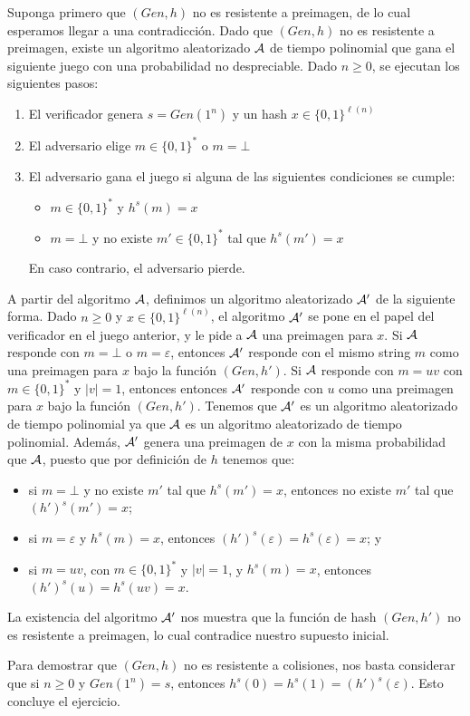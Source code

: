 \documentclass[11pt]{article}
\newcommand{\Gen}{\textit{Gen}}
\begin{document}
Suponga primero que $(\Gen, h)$ no es resistente a preimagen, de lo
cual esperamos llegar a una contradicción.  Dado que $(\Gen, h)$ no es
resistente a preimagen, existe un algoritmo aleatorizado ${\cal A}$ de
tiempo polinomial que gana el siguiente juego con una probabilidad no
despreciable. Dado $n \geq 0$, se ejecutan los siguientes pasos:
\begin{enumerate}
\item El verificador genera $s = \Gen(1^n)$ y un hash
  $x \in \{0,1\}^{\ell(n)}$
\item El adversario elige $m \in \{0,1\}^*$ o $m = \bot$
\item El adversario gana el juego si alguna de las siguientes condiciones se cumple:
\begin{itemize}
\item $m \in \{0,1\}^{*}$ y $h^s(m) = x$ 
\item $m = \bot$ y  no existe $m' \in \{0,1\}^*$ tal que $h^s(m') = x$
\end{itemize}
En caso contrario, el adversario pierde.
\end{enumerate}
A partir del algoritmo ${\cal A}$, definimos un algoritmo aleatorizado
${\cal A}'$ de la siguiente forma. Dado $n \geq 0$ y $x \in
\{0,1\}^{\ell(n)}$, el algoritmo ${\cal A}'$ se pone en el papel del
verificador en el juego anterior, y le pide a ${\cal A}$ una preimagen
para $x$. Si ${\cal A}$ responde con $m = \bot$ o $m = \varepsilon$,
entonces ${\cal A}'$ responde con el mismo string $m$ como una
preimagen para $x$ bajo la función $(\Gen, h')$. Si ${\cal A}$
responde con $m = uv$ con $m \in \{0,1\}^*$ y $|v| = 1$, entonces
entonces ${\cal A}'$ responde con $u$ como una preimagen para $x$ bajo
la función $(\Gen, h')$. Tenemos que ${\cal A'}$ es un algoritmo
aleatorizado de tiempo polinomial ya que ${\cal A}$ es un algoritmo
aleatorizado de tiempo polinomial. Además, ${\cal A}'$ genera una
preimagen de $x$ con la misma probabilidad que ${\cal A}$, puesto que
por definición de $h$ tenemos que:
\begin{itemize}
\item si $m = \bot$ y no existe $m'$ tal que $h^s(m') = x$, entonces
  no existe $m'$ tal que $(h')^s(m') = x$;

\item si $m = \varepsilon$ y $h^s(m) = x$, entonces $(h')^s(\varepsilon) =
  h^s(\varepsilon) = x$; y

\item si $m = uv$, con $m \in \{0,1\}^*$ y $|v| = 1$, y $h^s(m) = x$,
  entonces $(h')^s(u) = h^s(uv) = x$.
\end{itemize}
La existencia del algoritmo ${\cal A}'$ nos muestra que la
función de hash $(\Gen, h')$ no es resistente a preimagen, lo cual
contradice nuestro supuesto inicial.

Para demostrar que $(\Gen, h)$ no es resistente a colisiones, nos
basta considerar que si $n \geq 0$ y $\Gen(1^n) = s$, entonces $h^s(0)
= h^s(1) = (h')^s(\varepsilon)$. Esto concluye el ejercicio.
\end{document}
